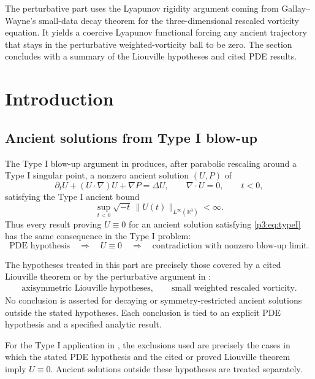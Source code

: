 \documentclass[11pt]{amsart}
\theoremstyle{plain}
\theoremstyle{definition}
\theoremstyle{remark}
\numberwithin{equation}{section}
\begin{document}
The perturbative part uses the Lyapunov rigidity argument coming from Gallay--Wayne's
small-data decay theorem for the three-dimensional rescaled vorticity equation.
It yields a coercive Lyapunov functional forcing any ancient trajectory that
stays in the perturbative weighted-vorticity ball to be zero.  The section
concludes with a summary of the Liouville hypotheses and cited PDE results.

\section{Introduction}

\subsection{Ancient solutions from Type I blow-up}

The Type I blow-up argument in  produces, after
parabolic rescaling around a Type I singular point, a nonzero ancient solution
\((U,P)\) of
\begin{equation}\label{p3:eq:NS}
   \partial_tU+(U\cdot\nabla)U+\nabla P=\Delta U,
   \qquad \nabla\cdot U=0,
   \qquad t<0,
\end{equation}
satisfying the Type I ancient bound
\begin{equation}\label{p3:eq:typeI}
   \sup_{t<0}\sqrt{-t}\,
   \|U(t)\|_{L^\infty(\mathbb R^3)}<\infty .
\end{equation}
Thus every result proving \(U\equiv0\) for an ancient solution satisfying
\eqref{p3:eq:typeI} has the same consequence in the Type I problem:
\[
   \text{PDE hypothesis}
   \quad\Longrightarrow\quad
   U\equiv0
   \quad\Longrightarrow\quad
   \text{contradiction with nonzero blow-up limit}.
\]

The hypotheses treated in this part are precisely those covered by a cited Liouville
theorem or by the perturbative argument in :
\[
   \begin{gathered}
   \text{axisymmetric Liouville hypotheses},\qquad
   \text{small weighted rescaled vorticity}.
   \end{gathered}
\]
No conclusion is asserted for decaying or symmetry-restricted ancient solutions
outside the stated hypotheses.  Each conclusion is tied to an explicit
PDE hypothesis and a specified analytic result.

For the Type I application in , the exclusions used are
precisely the cases in which the stated PDE hypothesis and the cited or proved
Liouville theorem imply \(U\equiv0\).  Ancient solutions outside these
hypotheses are treated separately.
\end{document}
